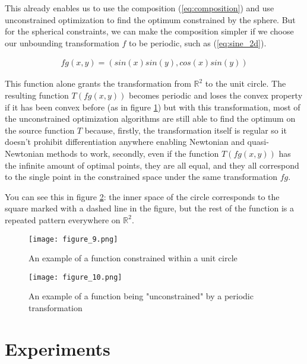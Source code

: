 \documentclass[
	a4paper, %
	10pt, %
	unnumberedsections, %
	twoside, %
]{LTJournalArticle}
\begin{document}
This already enables us to use the composition (\ref{eq:composition}) and use unconstrained optimization to find the optimum constrained by the sphere. But for the spherical constraints, we can make the composition simpler if we choose our unbounding transformation $f$ to be periodic, such as (\ref{eq:sine_2d}).

\begin{equation}
	\begin{split}
fg(x, y) = (sin(x)sin(y), cos(x)sin(y))
	\end{split}
	\label{eq:spherical_transformation2}
\end{equation}

This function alone grants the transformation from $\mathbb{R}^2$ to the unit circle. The resulting function $T(fg(x, y))$ becomes periodic and loses the convex property if it has been convex before (as in figure \ref{fig:circular_constrained}) but with this transformation, most of the unconstrained optimization algorithms are still able to find the optimum on the source function $T$ because, firstly, the transformation itself is regular so it doesn't prohibit differentiation anywhere enabling Newtonian and quasi-Newtonian methods to work, secondly, even if the function $T(fg(x, y))$ has the infinite amount of optimal points, they are all equal, and they all correspond to the single point in the constrained space under the same transformation $fg$. 

You can see this in figure \ref{fig:circular_unconstrained}: the inner space of the circle corresponds to the square marked with a dashed line in the figure, but the rest of the function is a repeated pattern everywhere on $\mathbb{R}^2$.

\begin{figure} 
	\texttt{[image: figure\_9.png]}
	\caption{An example of a function constrained within a unit circle}
	\label{fig:circular_constrained}
\end{figure}

\begin{figure} 
	\texttt{[image: figure\_10.png]}
	\caption{An example of a function being "unconstrained" by a periodic transformation}
	\label{fig:circular_unconstrained}
\end{figure}


\section{Experiments}
\end{document}
